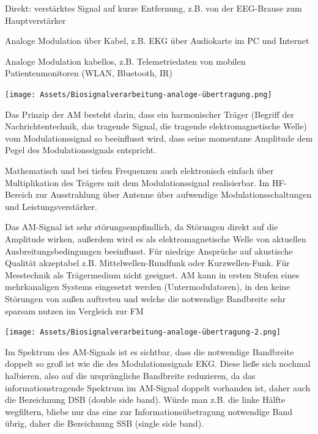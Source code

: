 \documentclass[a4paper]{article}
\begin{document}
\begin{multicols}{3}
  \begin{itemize*}
    \item Direkt: verstärktes Signal auf kurze Entfernung, z.B. von der EEG-Brause zum Hauptverstärker
    \item Analoge Modulation über Kabel, z.B. EKG über Audiokarte im PC und Internet
    \item Analoge Modulation kabellos, z.B. Telemetriedaten von mobilen Patientenmonitoren (WLAN, Bluetooth, IR)
    \item \texttt{[image: Assets/Biosignalverarbeitung-analoge-übertragung.png]}
    \item Das Prinzip der AM besteht darin, dass ein harmonischer Träger (Begriff der Nachrichtentechnik, das tragende Signal, die tragende elektromagnetische Welle) vom Modulationssignal so beeinflusst wird, dass seine momentane Amplitude dem Pegel des Modulationssignals entspricht.
    \begin{itemize*}
      \item Mathematisch und bei tiefen Frequenzen auch elektronisch einfach über Multiplikation des Trägers mit dem Modulationssignal realisierbar. Im HF-Bereich zur Ausstrahlung über Antenne über aufwendige Modulationsschaltungen und Leistungsverstärker.
      \item Das AM-Signal ist sehr störungsempfindlich, da Störungen direkt auf die Amplitude wirken, außerdem wird es als elektromagnetische Welle von aktuellen Ausbreitungsbedingungen beeinflusst. Für niedrige Ansprüche auf akustische Qualität akzeptabel z.B. Mittelwellen-Rundfunk oder Kurzwellen-Funk. Für Messtechnik als Trägermedium nicht geeignet. AM kann in ersten Stufen eines mehrkanaligen Systems eingesetzt werden (Untermodulatoren), in den keine Störungen von außen auftreten und welche die notwendige Bandbreite sehr sparsam nutzen im Vergleich zur FM
    \end{itemize*}
    \item \texttt{[image: Assets/Biosignalverarbeitung-analoge-übertragung-2.png]}
    \item Im Spektrum des AM-Signals ist es sichtbar, dass die notwendige Bandbreite doppelt so groß ist wie die des Modulationssignals EKG. Diese ließe sich nochmal halbieren, also auf die ursprüngliche Bandbreite reduzieren, da das informationstragende Spektrum im AM-Signal doppelt vorhanden ist, daher auch die Bezeichnung DSB (double side band). Würde man z.B. die linke Hälfte wegfiltern, bliebe nur das eine zur Informationsübetragung notwendige Band übrig, daher die Bezeichnung SSB (single side band).

\end{itemize*}
\end{multicols}
\end{document}
